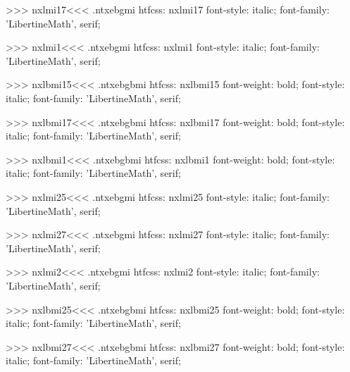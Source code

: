>>>
\<nxlmi17\><<<
.ntxebgmi
htfcss:  nxlmi17  font-style: italic; font-family: 'LibertineMath', serif;

>>>
\<nxlmi1\><<<
.ntxebgmi
htfcss:  nxlmi1  font-style: italic; font-family: 'LibertineMath', serif;

>>>
\<nxlbmi15\><<<
.ntxebgbmi
htfcss:  nxlbmi15  font-weight: bold; font-style: italic; font-family: 'LibertineMath', serif;

>>>
\<nxlbmi17\><<<
.ntxebgbmi
htfcss:  nxlbmi17  font-weight: bold; font-style: italic; font-family: 'LibertineMath', serif;

>>>
\<nxlbmi1\><<<
.ntxebgbmi
htfcss:  nxlbmi1  font-weight: bold; font-style: italic; font-family: 'LibertineMath', serif;

>>>
\<nxlmi25\><<<
.ntxebgmi
htfcss:  nxlmi25  font-style: italic; font-family: 'LibertineMath', serif;

>>>
\<nxlmi27\><<<
.ntxebgmi
htfcss:  nxlmi27  font-style: italic; font-family: 'LibertineMath', serif;

>>>
\<nxlmi2\><<<
.ntxebgmi
htfcss:  nxlmi2  font-style: italic; font-family: 'LibertineMath', serif;

>>>
\<nxlbmi25\><<<
.ntxebgbmi
htfcss:  nxlbmi25  font-weight: bold; font-style: italic; font-family: 'LibertineMath', serif;

>>>
\<nxlbmi27\><<<
.ntxebgbmi
htfcss:  nxlbmi27  font-weight: bold; font-style: italic; font-family: 'LibertineMath', serif;

